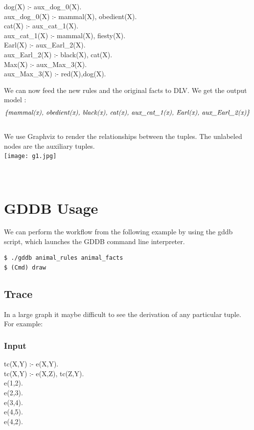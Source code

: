 \documentclass[12pt]{report}
\begin{document}
\begin{center}
dog(X) :- aux\_dog\_0(X). \\
aux\_dog\_0(X) :- mammal(X), obedient(X). \\
cat(X) :- aux\_cat\_1(X).  \\
aux\_cat\_1(X) :- mammal(X), fiesty(X). \\
Earl(X) :- aux\_Earl\_2(X).\\ 
aux\_Earl\_2(X) :- black(X), cat(X).\\
Max(X) :- aux\_Max\_3(X). \\
aux\_Max\_3(X) :- red(X),dog(X).\\
\end{center} 
We can now feed the new rules and the original facts to DLV. We get the output model :\\
\[\emph{\{mammal(x), obedient(x), black(x), cat(x), aux\_cat\_1(x), Earl(x), aux\_Earl\_2(x)\}}\]
\bigskip \\
We use Graphviz to render the relationships between the tuples. The unlabeled nodes are the auxiliary tuples.\\
\texttt{[image: g1.jpg]} \\
\bigskip \\
\bigskip \\
\section*{GDDB Usage}
We can perform the workflow from the following example by using the gddb script, which launches the GDDB command line interpreter.
\begin{verbatim}
$ ./gddb animal_rules animal_facts
$ (Cmd) draw
\end{verbatim}
\subsection*{Trace}
In a large graph it maybe difficult to see the derivation of any particular tuple. For example:
\subsubsection*{Input}
\begin{center}
tc(X,Y) :- e(X,Y). \\
tc(X,Y) :- e(X,Z), tc(Z,Y).\\
e(1,2). \\
e(2,3). \\
e(3,4). \\
e(4,5). \\ 
e(4,2). \\
\end{center}
\end{document}
